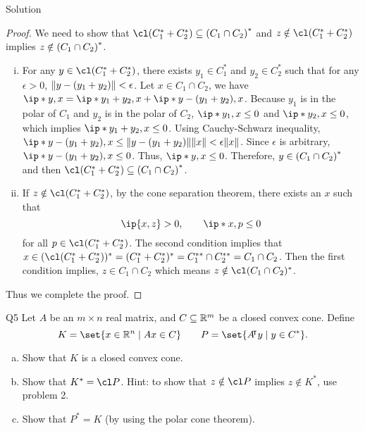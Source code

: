 \documentclass{article}
\begin{document}
\begin{solution}
    {Solution}
    \begin{proof}
        We need to show that $\cl \parens*{C_1^*+C_2^*} \subseteq \parens*{C_1\cap C_2}^*$ and $z\notin\cl(C_1^*+C_2^*)$ implies $z\notin \parens*{C_1\cap C_2}^*$.
        \begin{enumerate}[(i)]
            \item {
                For any $y\in \cl(C_1^*+C_2^*)$, there exists $y_1\in C_1^*$ and $y_2\in C_2^*$ such that for any $\epsilon>0$, $\norm{y-(y_1+y_2)}<\epsilon$. Let $x\in C_1\cap C_2$, we have $\ip*{y, x}=\ip*{y_1+y_2, x}+\ip*{y-(y_1+y_2), x}$. Because $y_1$ is in the polar of $C_1$ and $y_2$ is in the polar of $C_2$, $\ip*{y_1, x}\leq 0$ and $\ip*{y_2, x}\leq 0$, which implies $\ip*{y_1+y_2, x}\leq 0$. Using Cauchy-Schwarz inequality, $\ip*{y-(y_1+y_2), x}\leq \norm{y-(y_1+y_2)}\norm{x}<\epsilon\norm{x}$. Since $\epsilon$ is arbitrary, $\ip*{y-(y_1+y_2), x}\leq 0$. Thus, $\ip*{y, x}\leq 0$. Therefore, $y\in \parens*{C_1\cap C_2}^*$ and then $\cl(C_1^*+C_2^*)\subseteq \parens*{C_1\cap C_2}^*$.
            }
            \item {
                If $z\notin\cl(C_1^*+C_2^*)$, by the cone separation theorem, there exists an $x$ such that \[\ip{x,z}>0, \qquad \ip*{x,p}\leq 0\] for all $p\in \cl(C_1^*+C_2^*)$. The second condition implies that $x\in(\cl(C_1^*+C_2^*))^*=(C_1^*+C_2^*)^*=C_1^{**}\cap C_2^{**}=C_1\cap C_2$. Then the first condition implies, $z\in C_1\cap C_2$ which means $z\notin\cl(C_1\cap C_2)^*$.
            }
        \end{enumerate}
        Thus we complete the proof.
    \end{proof}
\end{solution}

\begin{problem}
    {Q5}
    Let $A$ be an $m\times n$ real matrix, and $C\subseteq \R^m$ be a closed convex cone. Define \[K=\set{x\in\R^n\mid Ax\in C} \qquad P=\set{A\trn y\mid y\in C^*}.\]
    \begin{enumerate}[(a)]
        \item Show that $K$ is a closed convex cone.
        \item Show that $K^*=\cl P$. Hint: to show that $z\notin \cl P$ implies $z\notin K^*$, use problem 2.
        \item Show that $P^*=K$ (by using the polar cone theorem).
    \end{enumerate}
\end{problem}
\end{document}
